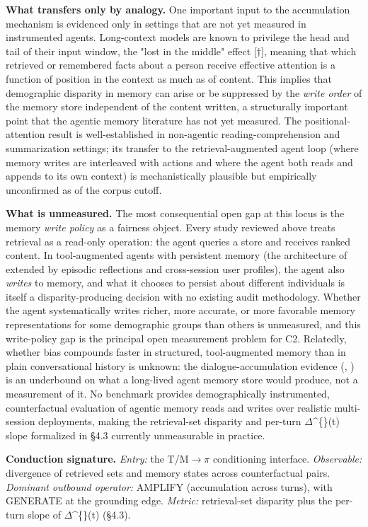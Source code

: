 \documentclass[10pt]{article}
\begin{document}
\textbf{What transfers only by analogy.} One important input to the accumulation mechanism is evidenced only in settings that are not yet measured in instrumented agents. Long-context models are known to privilege the head and tail of their input window, the "lost in the middle" effect \cite{liu2023lost}[$\dagger$], meaning that which retrieved or remembered facts about a person receive effective attention is a function of position in the context as much as of content. This implies that demographic disparity in memory can arise or be suppressed by the \emph{write order} of the memory store independent of the content written, a structurally important point that the agentic memory literature has not yet measured. The positional-attention result is well-established in non-agentic reading-comprehension and summarization settings; its transfer to the retrieval-augmented agent loop (where memory writes are interleaved with actions and where the agent both reads and appends to its own context) is mechanistically plausible but empirically unconfirmed as of the corpus cutoff.

\textbf{What is unmeasured.} The most consequential open gap at this locus is the memory \emph{write policy} as a fairness object. Every study reviewed above treats retrieval as a read-only operation: the agent queries a store and receives ranked content. In tool-augmented agents with persistent memory (the architecture of \cite{lewis2020retrieval} extended by episodic reflections and cross-session user profiles), the agent also \emph{writes} to memory, and what it chooses to persist about different individuals is itself a disparity-producing decision with no existing audit methodology. Whether the agent systematically writes richer, more accurate, or more favorable memory representations for some demographic groups than others is unmeasured, and this write-policy gap is the principal open measurement problem for C2. Relatedly, whether bias compounds faster in structured, tool-augmented memory than in plain conversational history is unknown: the dialogue-accumulation evidence (\cite{fan2024fairmt}, \cite{simhi2026old}) is an underbound on what a long-lived agent memory store would produce, not a measurement of it. No benchmark provides demographically instrumented, counterfactual evaluation of agentic memory reads and writes over realistic multi-session deployments, making the retrieval-set disparity and per-turn $\Delta$\textasciicircum\{\}(t) slope formalized in \S{}4.3 currently unmeasurable in practice.

\textbf{Conduction signature.} \emph{Entry:} the T/M$\rightarrow$$\pi$ conditioning interface. \emph{Observable:} divergence of retrieved sets and memory states across counterfactual pairs. \emph{Dominant outbound operator:} AMPLIFY (accumulation across turns), with GENERATE at the grounding edge. \emph{Metric:} retrieval-set disparity plus the per-turn slope of $\Delta$\textasciicircum\{\}(t) (\S{}4.3).
\end{document}
